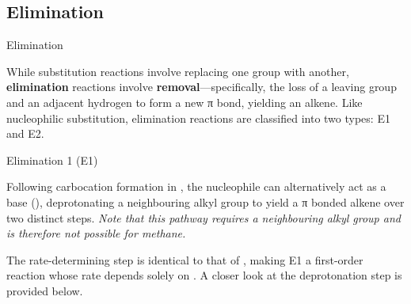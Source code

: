 \documentclass[10pt]{article}
\begin{document}
  \subsection{Elimination}
    
    \begin{core}{Elimination} 

      While substitution reactions involve replacing one group with another, \textbf{elimination} reactions involve \textbf{removal}---specifically, the loss of a leaving group and an adjacent hydrogen to form a new π bond, yielding an alkene. Like nucleophilic substitution, elimination reactions are classified into two types: E1 and E2.

    \end{core}

    \begin{core}{Elimination 1 (E1)}

      Following carbocation formation in \sno, the nucleophile can alternatively act as a base (), deprotonating a neighbouring alkyl group to yield a π bonded alkene over two distinct steps. \textit{Note that this pathway requires a neighbouring alkyl group and is therefore not possible for methane.}

      \vspace{10pt}

      The rate-determining step is identical to that of \sno, making E1 a first-order reaction whose rate depends solely on \ce{[R-L]}. A closer look at the deprotonation step is provided below.


\end{core}
\end{document}
